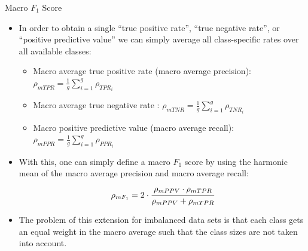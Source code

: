 \documentclass[11pt,compress,t,notes=noshow, xcolor=table]{beamer}
\begin{document}
\begin{vbframe}{Macro $F_1$ Score}
	\footnotesize{
	\begin{itemize}
%		
		\item In order to obtain a single ``true positive rate'',  ``true negative rate'', or ``positive predictive value'' we can simply average all class-specific rates over all available classes:
		\begin{itemize}
			\footnotesize
			\item Macro average true positive rate (macro average precision): $\rho_{mTPR} = \frac{1}{g}\sum_{i=1}^g  \rho_{TPR_i}$
			\item Macro average true negative rate : $\rho_{mTNR} = \frac{1}{g}\sum_{i=1}^g  \rho_{TNR_i}$
			\item Macro positive predictive value (macro average recall): $\rho_{mPPR} = \frac{1}{g}\sum_{i=1}^g  \rho_{PPR_i}$
		\end{itemize}
		\item With this, one can simply define a macro $F_1$ score by using the harmonic mean of the macro average precision and macro average recall:
		$$\rho_{mF_1} = 2 \cdot \cfrac{\rho_{mPPV} \cdot \rho_{mTPR}}{\rho_{mPPV} + 
			\rho_{mTPR}}$$
		\item The problem of this extension for imbalanced data sets is that each class gets an equal weight in the macro average such that the class sizes are not taken into account.
%
	\end{itemize}
	}
\end{vbframe}
\end{document}
